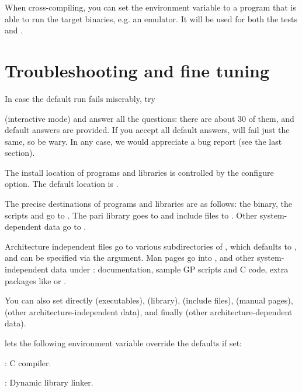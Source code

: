 
When cross-compiling, you can set the environment variable  to a
program that is able to run the target binaries, e.g. an emulator. It will be
used for both the  tests and .

\section{Troubleshooting and fine tuning}
In case the default  run fails miserably, try


\noindent (interactive mode) and answer all the questions: there are about 30
of them, and default answers are provided. If you accept all default answers,
 will fail just the same, so be wary. In any case, we would
appreciate a bug report (see the last section).

 The install location of programs and
libraries is controlled by the  configure option. The default
location is .

The precise destinations of programs and libraries are as
follows: the  binary, the scripts  and  go
to . The pari library goes to  and
include files to . Other system-dependent data go
to .

Architecture independent files go to various subdirectories of
, which defaults to , and can be
specified via the  argument. Man pages go into
, and other system-independent data
under : documentation,
sample GP scripts and C code, extra packages like  or
.

\noindent You can also set directly  (executables),
 (library),  (include files), 
(manual pages),  (other architecture-independent data), and
finally  (other architecture-dependent data).

  lets the following environment
variable override the defaults if set:

: C compiler.

: Dynamic library linker.

